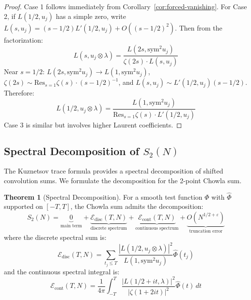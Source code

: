 \documentclass[11pt,a4paper]{article}
\theoremstyle{definition}
\newtheorem{theorem}{Theorem}[section]
\newcommand{\Sym}{\mathrm{sym}}
\newcommand{\disc}{\mathrm{disc}}
\newcommand{\cont}{\mathrm{cont}}
\newcommand{\Res}{\mathrm{Res}}
\begin{document}
\begin{proof}
Case 1 follows immediately from Corollary~\ref{cor:forced-vanishing}. For Case 2, if $L(1/2, u_j)$ has a simple zero, write $L(s, u_j) = (s-1/2) L'(1/2, u_j) + O((s-1/2)^2)$. Then from the factorization:
\begin{equation}
L(s, u_j \otimes \lambda) = \frac{L(2s, \Sym^2 u_j)}{\zeta(2s) \cdot L(s, u_j)}
\end{equation}
Near $s = 1/2$: $L(2s, \Sym^2 u_j) \to L(1, \Sym^2 u_j)$, $\zeta(2s) \sim \Res_{s=1}\zeta(s) \cdot (s-1/2)^{-1}$, and $L(s, u_j) \sim L'(1/2, u_j)(s-1/2)$. Therefore:
\begin{equation}
L(1/2, u_j \otimes \lambda) = \frac{L(1, \Sym^2 u_j)}{\Res_{s=1}\zeta(s) \cdot L'(1/2, u_j)}
\end{equation}
Case 3 is similar but involves higher Laurent coefficients.
\end{proof}

\subsection{Spectral Decomposition of $S_2(N)$}

The Kuznetsov trace formula provides a spectral decomposition of shifted convolution sums. We formulate the decomposition for the 2-point Chowla sum.

\begin{theorem}[Spectral Decomposition]
\label{thm:spectral-decomp}
For a smooth test function $\Phi$ with $\hat{\Phi}$ supported on $[-T, T]$, the Chowla sum admits the decomposition:
\begin{equation}
S_2(N) = \underbrace{0}_{\text{main term}} + \underbrace{\mathcal{E}_{\disc}(T, N)}_{\text{discrete spectrum}} + \underbrace{\mathcal{E}_{\cont}(T, N)}_{\text{continuous spectrum}} + \underbrace{O(N^{1/2+\varepsilon})}_{\text{truncation error}}
\end{equation}
where the discrete spectral sum is:
\begin{equation}
\mathcal{E}_{\disc}(T, N) = \sum_{t_j \le T} \frac{|L(1/2, u_j \otimes \lambda)|^2}{L(1, \Sym^2 u_j)} \hat{\Phi}(t_j)
\end{equation}
and the continuous spectral integral is:
\begin{equation}
\mathcal{E}_{\cont}(T, N) = \frac{1}{4\pi} \int_{-T}^{T} \frac{|L(1/2+it, \lambda)|^2}{|\zeta(1+2it)|^2} \hat{\Phi}(t) \, dt
\end{equation}
\end{theorem}
\end{document}
